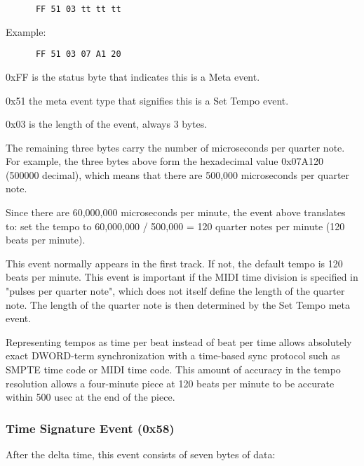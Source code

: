    \begin{verbatim}
      FF 51 03 tt tt tt
   \end{verbatim}

   Example:

   \begin{verbatim}
      FF 51 03 07 A1 20
   \end{verbatim}

   \begin{enumber}
      \item 0xFF is the status byte that indicates this is a Meta event.
      \item 0x51 the meta event type that signifies this is a Set Tempo event.
      \item 0x03 is the length of the event, always 3 bytes.
      \item The remaining three bytes carry the number of microseconds per
         quarter note.  For example, the three bytes above form the hexadecimal
         value 0x07A120 (500000 decimal), which means that there are 500,000
         microseconds per quarter note.
   \end{enumber}

   Since there are 60,000,000 microseconds per minute, the event above
   translates to: set the tempo to 60,000,000 / 500,000 = 120 quarter notes per
   minute (120 beats per minute).

   This event normally appears in the first track. If not, the default tempo is
   120 beats per minute.  This event is important if the MIDI time division is
   specified in "pulses per quarter note", which does not itself define the
   length of the quarter note. The length of the quarter note is then
   determined by the Set Tempo meta event.

   Representing tempos as time per beat instead of beat per time allows
   absolutely exact DWORD-term synchronization with a time-based sync protocol
   such as SMPTE time code or MIDI time code.  This amount of accuracy
   in the tempo resolution allows a four-minute piece at 120 beats per minute
   to be accurate within 500 usec at the end of the piece.

\subsubsection{Time Signature Event (0x58)}
\label{subsubsec:midi_format_meta_time_sig}

   After the delta time, this event consists of seven bytes of data:

